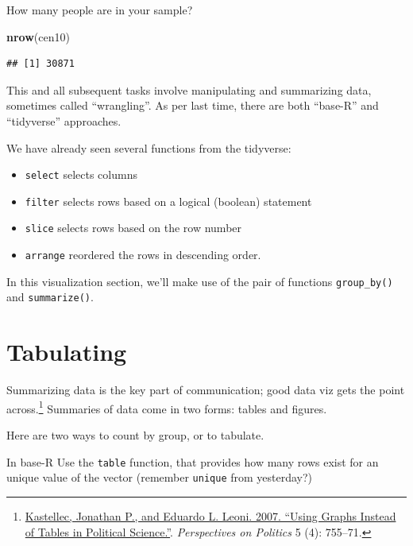 \documentclass[
]{book}
\newenvironment{Shaded}{\begin{snugshade}}{\end{snugshade}}
\newcommand{\KeywordTok}[1]{\textcolor[rgb]{0.13,0.29,0.53}{\textbf{#1}}}
\newcommand{\NormalTok}[1]{#1}
\newcommand{\OperatorTok}[1]{\textcolor[rgb]{0.81,0.36,0.00}{\textbf{#1}}}
\providecommand{\tightlist}{%
  \setlength{\itemsep}{0pt}\setlength{\parskip}{0pt}}
\theoremstyle{definition}
\theoremstyle{definition}
\theoremstyle{definition}
\theoremstyle{remark}
\begin{document}
How many people are in your sample?

\begin{Shaded}
\begin{Highlighting}[]
\KeywordTok{nrow}\NormalTok{(cen10)}
\end{Highlighting}
\end{Shaded}

\begin{verbatim}
## [1] 30871
\end{verbatim}

This and all subsequent tasks involve manipulating and summarizing data, sometimes called ``wrangling''. As per last time, there are both ``base-R'' and ``tidyverse'' approaches.

We have already seen several functions from the tidyverse:

\begin{itemize}
\tightlist
\item
  \texttt{select} selects columns
\item
  \texttt{filter} selects rows based on a logical (boolean) statement
\item
  \texttt{slice} selects rows based on the row number
\item
  \texttt{arrange} reordered the rows in descending order.
\end{itemize}

In this visualization section, we'll make use of the pair of functions \texttt{group\_by()} and \texttt{summarize()}.

\hypertarget{tabulating}{%
\section{Tabulating}\label{tabulating}}

Summarizing data is the key part of communication; good data viz gets the point across.\footnote{\href{http://www.princeton.edu/~jkastell/Tables2Graphs/graphs.pdf}{Kastellec, Jonathan P., and Eduardo L. Leoni. 2007. ``Using Graphs Instead of Tables in Political Science.''}. \emph{Perspectives on Politics} 5 (4): 755--71.} Summaries of data come in two forms: tables and figures.

Here are two ways to count by group, or to tabulate.

In base-R Use the \texttt{table} function, that provides how many rows exist for an unique value of the vector (remember \texttt{unique} from yesterday?)

\begin{Shaded}
\end{Shaded}
\end{document}

